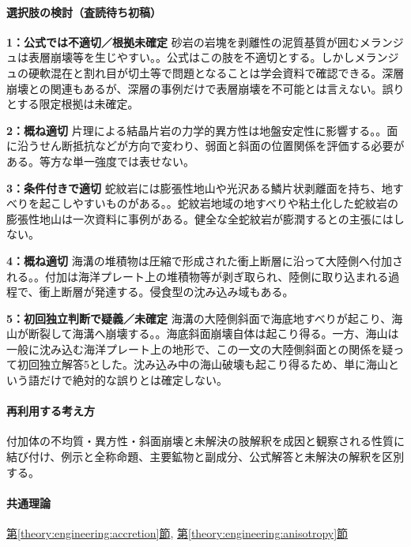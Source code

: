 \paragraph{選択肢の検討（査読待ち初稿）}\mbox{}\par

\noindent\textbf{1：公式では不適切／根拠未確定} 砂岩の岩塊を剥離性の泥質基質が囲むメランジュは表層崩壊等を生じやすい。。公式はこの肢を不適切とする。しかしメランジュの硬軟混在と割れ目が切土等で問題となることは学会資料で確認できる。深層崩壊との関連もあるが、深層の事例だけで表層崩壊を不可能とは言えない。誤りとする限定根拠は未確定。\par

\noindent\textbf{2：概ね適切} 片理による結晶片岩の力学的異方性は地盤安定性に影響する。。面に沿うせん断抵抗などが方向で変わり、弱面と斜面の位置関係を評価する必要がある。等方な単一強度では表せない。\par

\noindent\textbf{3：条件付きで適切} 蛇紋岩には膨張性地山や光沢ある鱗片状剥離面を持ち、地すべりを起こしやすいものがある。。蛇紋岩地域の地すべりや粘土化した蛇紋岩の膨張性地山は一次資料に事例がある。健全な全蛇紋岩が膨潤するとの主張にはしない。\par

\noindent\textbf{4：概ね適切} 海溝の堆積物は圧縮で形成された衝上断層に沿って大陸側へ付加される。。付加は海洋プレート上の堆積物等が剥ぎ取られ、陸側に取り込まれる過程で、衝上断層が発達する。侵食型の沈み込み域もある。\par

\noindent\textbf{5：初回独立判断で疑義／未確定} 海溝の大陸側斜面で海底地すべりが起こり、海山が断裂して海溝へ崩壊する。。海底斜面崩壊自体は起こり得る。一方、海山は一般に沈み込む海洋プレート上の地形で、この一文の大陸側斜面との関係を疑って初回独立解答5とした。沈み込み中の海山破壊も起こり得るため、単に海山という語だけで絶対的な誤りとは確定しない。\par

\paragraph{再利用する考え方} 付加体の不均質・異方性・斜面崩壊と未解決の肢解釈を成因と観察される性質に結び付け、例示と全称命題、主要鉱物と副成分、公式解答と未解決の解釈を区別する。

\paragraph{共通理論} \hyperref[theory:engineering:accretion]{第\ref*{theory:engineering:accretion}節}, \hyperref[theory:engineering:anisotropy]{第\ref*{theory:engineering:anisotropy}節}

